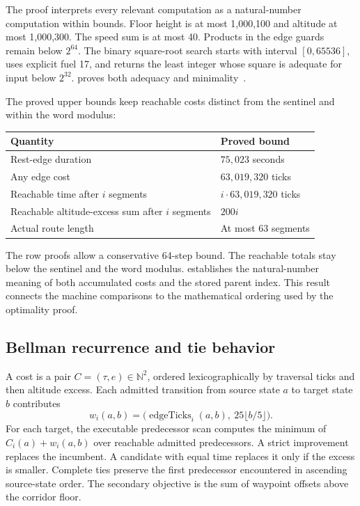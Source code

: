 \documentclass[11pt]{article}
\newcommand{\N}{\mathbb N}
\begin{document}
The proof interprets every relevant  computation as a natural-number computation within bounds.  Floor height is at most 1,000,100 and altitude at most 1,000,300.  The speed sum is at most 40.  Products in the edge guards remain below $2^{64}$.  The binary square-root search starts with interval $[0,65536]$, uses explicit fuel 17, and returns the least integer whose square is adequate for input below $2^{32}$.   proves both adequacy and minimality~\cite{drone-proofs}.

The proved upper bounds keep reachable costs distinct from the sentinel and within the word modulus:
\begin{center}
\begin{tabular}{ll}
\toprule
Quantity & Proved bound\\
\midrule
Rest-edge duration & $75{,}023$ seconds\\
Any edge cost & $63{,}019{,}320$ ticks\\
Reachable time after $i$ segments & $i\cdot63{,}019{,}320$ ticks\\
Reachable altitude-excess sum after $i$ segments & $200i$\\
Actual route length & At most 63 segments\\
\bottomrule
\end{tabular}
\end{center}
The row proofs allow a conservative 64-step bound.  The reachable totals stay below the sentinel and the word modulus.   establishes the natural-number meaning of both accumulated costs and the stored parent index.  This result connects the machine comparisons to the mathematical ordering used by the optimality proof.

\subsection{Bellman recurrence and tie behavior}

A cost is a pair $C=(\tau,e)\in\N^2$, ordered lexicographically by traversal ticks and then altitude excess.  Each admitted transition from source state $a$ to target state $b$ contributes
\[
 w_i(a,b)=\bigl(\operatorname{edgeTicks}_i(a,b),\ 25\lfloor b/5\rfloor\bigr).
\]
For each target, the executable predecessor scan computes the minimum of $C_i(a)+w_i(a,b)$ over reachable admitted predecessors.  A strict improvement replaces the incumbent.  A candidate with equal time replaces it only if the excess is smaller.  Complete ties preserve the first predecessor encountered in ascending source-state order.  The secondary objective is the sum of waypoint offsets above the corridor floor.
\end{document}
